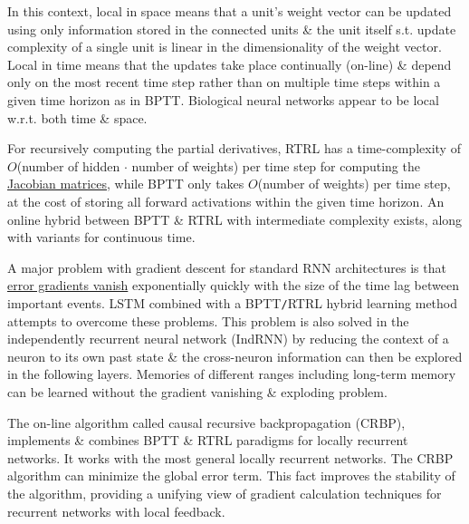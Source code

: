 \documentclass{article}
\begin{document}
\begin{itemize}
	In this context, local in space means that a unit's weight vector can be updated using only information stored in the connected units \& the unit itself s.t. update complexity of a single unit is linear in the dimensionality of the weight vector. Local in time means that the updates take place continually (on-line) \& depend only on the most recent time step rather than on multiple time steps within a given time horizon as in BPTT. Biological neural networks appear to be local w.r.t. both time \& space.
	
	For recursively computing the partial derivatives, RTRL has a time-complexity of $O$(number of hidden $\cdot$ number of weights) per time step for computing the \href{https://en.wikipedia.org/wiki/Jacobian_matrix}{Jacobian matrices}, while BPTT only takes $O$(number of weights) per time step, at the cost of storing all forward activations within the given time horizon. An online hybrid between BPTT \& RTRL with intermediate complexity exists, along with variants for continuous time.
	
	A major problem with gradient descent for standard RNN architectures is that \href{https://en.wikipedia.org/wiki/Vanishing_gradient_problem}{error gradients vanish} exponentially quickly with the size of the time lag between important events. LSTM combined with a BPTT{\tt/}RTRL hybrid learning method attempts to overcome these problems. This problem is also solved in the independently recurrent neural network (IndRNN) by reducing the context of a neuron to its own past state \& the cross-neuron information can then be explored in the following layers. Memories of different ranges including long-term memory can be learned without the gradient vanishing \& exploding problem.
	
	The on-line algorithm called causal recursive backpropagation (CRBP), implements \& combines BPTT \& RTRL paradigms for locally recurrent networks. It works with the most general locally recurrent networks. The CRBP algorithm can minimize the global error term. This fact improves the stability of the algorithm, providing a unifying view of gradient calculation techniques for recurrent networks with local feedback.
	

\end{itemize}
\end{document}
